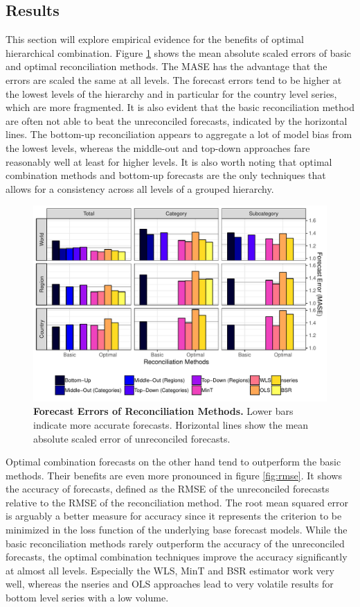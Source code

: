 \documentclass[a4paper,fleqn,11pt]{article}
\begin{document}
\subsection{Results}
This section will explore empirical evidence for the benefits of optimal hierarchical combination. Figure \ref{fig:mase} shows the mean absolute scaled errors of basic and optimal reconciliation methods. The MASE has the advantage that the errors are scaled the same at all levels. The forecast errors tend to be higher at the lowest levels of the hierarchy and in particular for the country level series, which are more fragmented. It is also evident that the basic reconciliation method are often not able to beat the unreconciled forecasts, indicated by the horizontal lines. The bottom-up reconciliation appears to aggregate a lot of model bias from the lowest levels, whereas the middle-out and top-down approaches fare reasonably well at least for higher levels. It is also worth noting that optimal combination methods and bottom-up forecasts are the only techniques that allows for a consistency across all levels of a grouped hierarchy.
\begin{figure}[H]
 	\includegraphics[width=\textwidth]{fig/fig_eval_mase}
 	\caption[Forecast Errors of Reconciliation Methods]{\textbf{Forecast Errors of Reconciliation Methods.} Lower bars indicate more accurate forecasts. Horizontal lines show the mean absolute scaled error of unreconciled forecasts.}\label{fig:mase}
 \end{figure}
Optimal combination forecasts on the other hand tend to outperform the basic methods. Their benefits are even more pronounced in figure \ref{fig:rmse}. It shows the accuracy of forecasts, defined as the RMSE of the unreconciled forecasts relative to the RMSE of the reconciliation method. The root mean squared error is arguably a better measure for accuracy since it represents the criterion to be minimized in the loss function of the underlying base forecast models. While the basic reconciliation methods rarely outperform the accuracy of the unreconciled forecasts, the optimal combination techniques improve the accuracy significantly at almost all levels. Especially the WLS, MinT and BSR estimator work very well, whereas the nseries and OLS approaches lead to very volatile results for bottom level series with a low volume.
\end{document}
